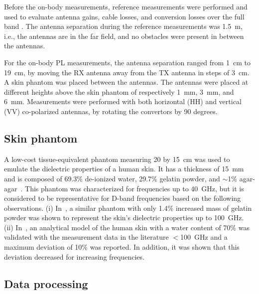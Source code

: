 \documentclass[preprint]{rsl}
\begin{document}
Before the on-body measurements, reference measurements were performed and used to evaluate antenna gains, cable losses, and conversion losses over the full band \cite{DeBeelde2021_eucap}. 
The antenna separation during the reference measurements was 1.5~m, i.e., the antennas are in the far field, and no obstacles were present in between the antennas. 

For the on-body PL measurements, the antenna separation ranged from 1~cm to 19~cm, by moving the RX antenna away from the TX antenna in steps of 3~cm.
A skin phantom was placed between the antennas. 
The antennas were placed at different heights above the skin phantom of respectively 1~mm, 3~mm, and 6~mm. 
Measurements were performed with both horizontal (HH) and vertical (VV) co-polarized antennas, by rotating the convertors by 90 degrees.

\subsection{Skin phantom}

A low-cost tissue-equivalent phantom measuring 20 by 15~cm was used to emulate the dielectric properties of a human skin. 
It has a thickness of 15~mm and is composed of 69.3\% de-ionized water, 29.7\% gelatin powder, and $\sim$1\% agar-agar~\cite{aminzadeh2014_ELetters}. 
This phantom was characterized for frequencies up to 40~GHz, but it is considered to be representative for D-band frequencies based on the following observations.
(i) In~\cite{aminzadeh2017_awpl}, a similar phantom with only 1.4\% increased mass of gelatin powder was shown to represent the skin's dielectric properties up to 100~GHz. 
(ii) In~\cite{aminzadeh2014_thesis}, an analytical model of the human skin with a water content of 70\% was validated with the measurement data in the literature $<$100~GHz and a maximum deviation of 10\% was reported. 
In addition, it was shown that this deviation decreased for increasing frequencies.

\subsection{Data processing}
\end{document}
